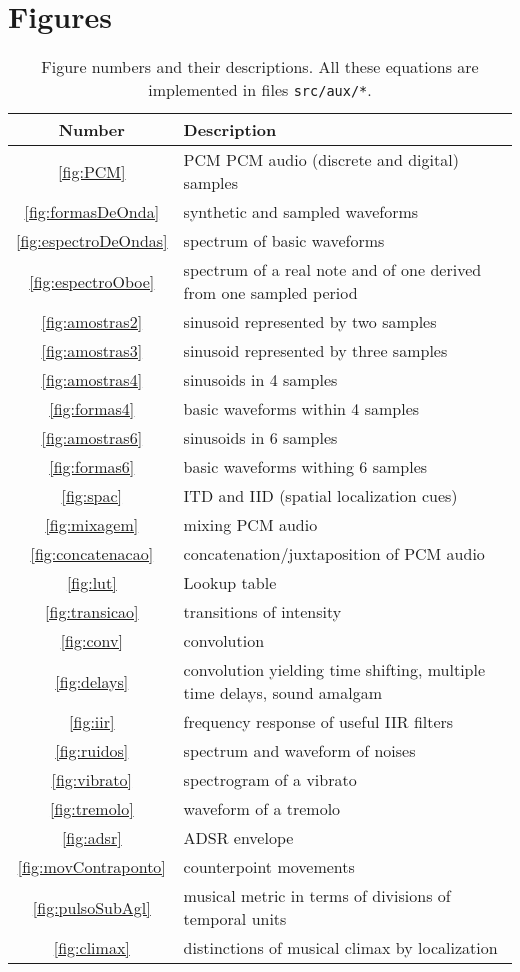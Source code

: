 \documentclass{scrreprt}
\begin{document}
\clearpage
\section{Figures}\label{sec:lfigures}

\begin{table*}[htp!]
\centering
\caption{Figure numbers and their descriptions.
All these equations are implemented in files \texttt{src/aux/*}.}
\begin{tabular}{ c | p{12cm} }
   Number & Description \\\hline
 \ref{fig:PCM} & PCM PCM audio (discrete and digital) samples \\
 \ref{fig:formasDeOnda} & synthetic and sampled waveforms \\
 \ref{fig:espectroDeOndas} & spectrum of basic waveforms \\
 \ref{fig:espectroOboe} & spectrum of a real note and of one derived from one sampled period \\
 \ref{fig:amostras2} & sinusoid represented by two samples \\
 \ref{fig:amostras3} & sinusoid represented by three samples \\
 \ref{fig:amostras4} & sinusoids in 4 samples \\
 \ref{fig:formas4} & basic waveforms within 4 samples \\
 \ref{fig:amostras6} & sinusoids in 6 samples \\
 \ref{fig:formas6} & basic waveforms withing 6 samples \\
 \ref{fig:spac} & ITD and IID (spatial localization cues)\\
 \ref{fig:mixagem} & mixing PCM audio \\
 \ref{fig:concatenacao} & concatenation/juxtaposition of PCM audio \\
 \ref{fig:lut} & Lookup table \\
 \ref{fig:transicao} & transitions of intensity \\
 \ref{fig:conv} & convolution \\
 \ref{fig:delays} & convolution yielding time shifting, multiple time delays, sound amalgam \\
 \ref{fig:iir} & frequency response of useful IIR filters \\
 \ref{fig:ruidos} & spectrum and waveform of noises \\
 \ref{fig:vibrato} & spectrogram of a vibrato \\
 \ref{fig:tremolo} & waveform of a tremolo \\
 \ref{fig:adsr} & ADSR envelope \\
 \ref{fig:movContraponto} & counterpoint movements \\
 \ref{fig:pulsoSubAgl} & musical metric in terms of divisions of temporal units \\
 \ref{fig:climax} & distinctions of musical climax by localization \\
\end{tabular}
\end{table*}
\end{document}
